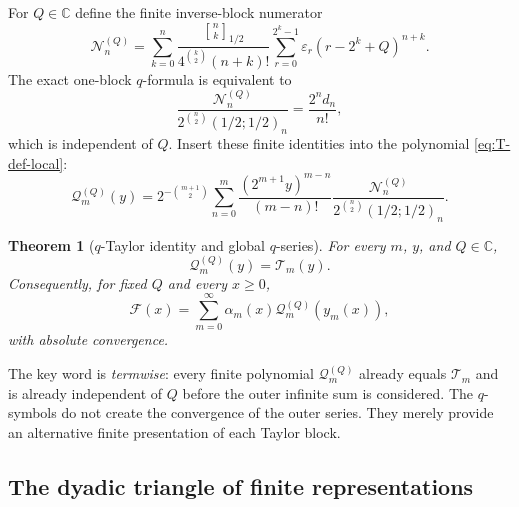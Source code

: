 \documentclass[11pt,oneside]{article}
\newtheorem{theorem}{Theorem}[section]
\theoremstyle{definition}
\theoremstyle{remark}
\newcommand{\C}{\mathbb C}
\newcommand{\qbinom}[3]{\genfrac{[}{]}{0pt}{}{#1}{#2}_{#3}}
\newcommand{\tm}{\varepsilon}
\begin{document}
For $Q\in\C$ define the finite inverse-block numerator
\begin{equation}
 \mathcal N_n^{(Q)}=
 \sum_{k=0}^{n}
 \frac{\qbinom nk{1/2}}{4^{\binom k2}(n+k)!}
 \sum_{r=0}^{2^k-1}\tm_r(r-2^k+Q)^{n+k}.                  \label{eq:NnQ-local}
\end{equation}
The exact one-block $q$-formula is equivalent to
\begin{equation}
 \frac{\mathcal N_n^{(Q)}}
 {2^{\binom n2}(1/2;1/2)_n}
 =\frac{2^nd_n}{n!},                                      \label{eq:NnQ-normalization-local}
\end{equation}
which is independent of $Q$.  Insert these finite identities into the polynomial
\eqref{eq:T-def-local}:
\begin{equation}
 \mathcal Q_m^{(Q)}(y)=
 2^{-\binom{m+1}{2}}
 \sum_{n=0}^{m}
 \frac{(2^{m+1}y)^{m-n}}{(m-n)!}
 \frac{\mathcal N_n^{(Q)}}
 {2^{\binom n2}(1/2;1/2)_n}.                              \label{eq:QmQ-local}
\end{equation}

\begin{theorem}[$q$-Taylor identity and global $q$-series]
\label{thm:q-global-local}
For every $m$, $y$, and $Q\in\C$,
\begin{equation}
 \mathcal Q_m^{(Q)}(y)=\mathcal T_m(y).                   \label{eq:Qm-equals-Tm-local}
\end{equation}
Consequently, for fixed $Q$ and every $x\ge0$,
\begin{equation}
 \boxed{
 \mathcal F(x)=\sum_{m=0}^{\infty}
 \alpha_m(x)\mathcal Q_m^{(Q)}(y_m(x)),}                 \label{eq:global-q-series-local}
\end{equation}
with absolute convergence.
\end{theorem}

The key word is \emph{termwise}: every finite polynomial
$\mathcal Q_m^{(Q)}$ already equals $\mathcal T_m$ and is already independent of $Q$ before
the outer infinite sum is considered.  The $q$-symbols do not create the convergence of the
outer series.  They merely provide an alternative finite presentation of each Taylor block.

\subsection{The dyadic triangle of finite representations}
\end{document}
